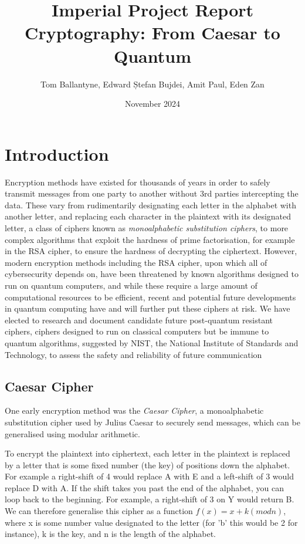 \documentclass{article}
\title{Imperial Project Report \\ 
Cryptography: From Caesar to Quantum}
\author{Tom Ballantyne, Edward Ștefan Bujdei, Amit Paul, Eden Zan}
\date{November 2024} %
\begin{document}
\maketitle

\tableofcontents

\section{Introduction}
Encryption methods have existed for thousands of years in order to safely
transmit messages from one party to another without 3rd parties
intercepting the data. These vary from rudimentarily designating each
letter in the alphabet with another letter, and replacing each character in
the plaintext with its designated letter, a class of ciphers known as
\textit{monoalphabetic substitution ciphers}, to more complex algorithms
that exploit the hardness of prime factorisation, for example in the RSA
cipher, to ensure the hardness of decrypting the ciphertext. However,
modern encryption methods including the RSA cipher, upon which all of
cybersecurity depends on, have been threatened by known algorithms designed
to run on quantum computers, and while these require a large amount of
computational resources to be efficient, recent and potential future
developments in quantum computing have and will further put these ciphers
at risk. We have elected to research and document candidate future
post-quantum resistant ciphers, ciphers designed to run on classical
computers but be immune to quantum algorithms, suggested by NIST, the
National Institute of Standards and Technology, to assess the safety and
reliability of future communication

\subsection{Caesar Cipher}
One early encryption method was the \textit{Caesar Cipher}, a monoalphabetic 
substitution cipher used by Julius Caesar to securely send messages, which can
be generalised using modular arithmetic.
\medskip

To encrypt the plaintext into ciphertext, each
letter in the plaintext is replaced by a letter that is some fixed number (the
key) of positions down the alphabet. For example a right-shift of 4 would
replace A with E and a left-shift of 3 would replace D with A. If the shift
takes you past the end of the alphabet, you can loop back to the beginning. For
example, a right-shift of 3 on Y would return B. We can therefore generalise 
this cipher as a function $f(x) = x + k (mod n) $, where x is some number value
designated to the letter (for 'b' this would be 2 for instance), k is the key, 
and n is the length of the alphabet.
\medskip
\end{document}
